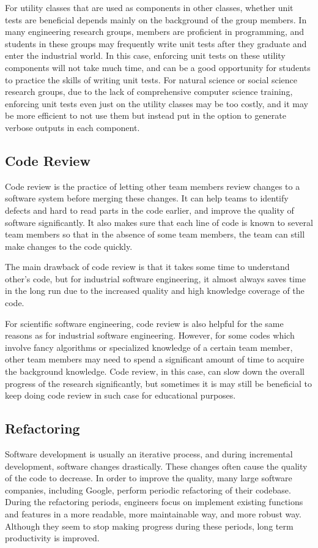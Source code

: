 For utility classes that are used as components in other classes, whether unit tests are beneficial depends mainly on the background of the group members.
In many engineering research groups, members are proficient in programming, and students in these groups may frequently write unit tests after they graduate and enter the industrial world.
In this case, enforcing unit tests on these utility components will not take much time, and can be a good opportunity for students to practice the skills of writing unit tests.
For natural science or social science research groups, due to the lack of comprehensive computer science training, enforcing unit tests even just on the utility classes may be too costly, and it may be more efficient to not use them but instead put in the option to generate verbose outputs in each component.

\subsection{Code Review}
Code review is the practice of letting other team members review changes to a software system before merging these changes.
It can help teams to identify defects and hard to read parts in the code earlier, and improve the quality of software significantly.
It also makes sure that each line of code is known to several team members so that in the absence of some team members, the team can still make changes to the code quickly.

The main drawback of code review is that it takes some time to understand other's code, but for industrial software engineering, it almost always saves time in the long run due to the increased quality and high knowledge coverage of the code.

For scientific software engineering, code review is also helpful for the same reasons as for industrial software engineering.
However, for some codes which involve fancy algorithms or specialized knowledge of a certain team member, other team members may need to spend a significant amount of time to acquire the background knowledge.
Code review, in this case, can slow down the overall progress of the research significantly, but sometimes it is may still be beneficial to keep doing code review in such case for educational purposes.

\subsection{Refactoring}
Software development is usually an iterative process, and during incremental development, software changes drastically.
These changes often cause the quality of the code to decrease.
In order to improve the quality, many large software companies, including Google, perform periodic refactoring of their codebase.
During the refactoring periods, engineers focus on implement existing functions and features in a more readable, more maintainable way, and more robust way.
Although they seem to stop making progress during these periods, long term productivity is improved.

